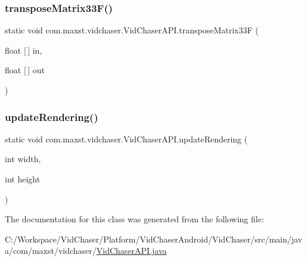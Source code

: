 \mbox{\label{classcom_1_1maxst_1_1vidchaser_1_1_vid_chaser_a_p_i_a7883ba1837bd5c3f84ec45ca66414b05}} 
\subsubsection{\texorpdfstring{transpose\+Matrix33\+F()}{transposeMatrix33F()}}
{\footnotesize\ttfamily static void com.\+maxst.\+vidchaser.\+Vid\+Chaser\+A\+P\+I.\+transpose\+Matrix33F (\begin{DoxyParamCaption}\item[{float \mbox{[}$\,$\mbox{]}}]{in,  }\item[{float \mbox{[}$\,$\mbox{]}}]{out }\end{DoxyParamCaption})\hspace{0.3cm}{\ttfamily [static]}}

\mbox{\label{classcom_1_1maxst_1_1vidchaser_1_1_vid_chaser_a_p_i_a72fa4502f5dcc8d1e765167be9a05cae}} 
\subsubsection{\texorpdfstring{update\+Rendering()}{updateRendering()}}
{\footnotesize\ttfamily static void com.\+maxst.\+vidchaser.\+Vid\+Chaser\+A\+P\+I.\+update\+Rendering (\begin{DoxyParamCaption}\item[{int}]{width,  }\item[{int}]{height }\end{DoxyParamCaption})\hspace{0.3cm}{\ttfamily [static]}}



The documentation for this class was generated from the following file\+:\begin{DoxyCompactItemize}
\item 
C\+:/\+Workspace/\+Vid\+Chaser/\+Platform/\+Vid\+Chaser\+Android/\+Vid\+Chaser/src/main/java/com/maxst/vidchaser/\hyperlink{_vid_chaser_a_p_i_8java}{Vid\+Chaser\+A\+P\+I.\+java}\end{DoxyCompactItemize}
